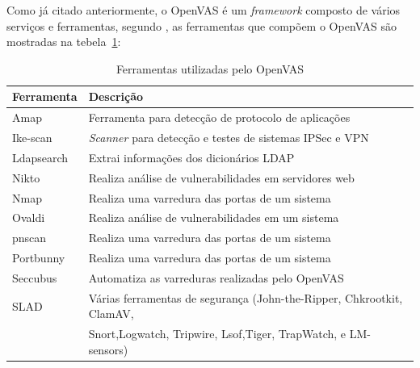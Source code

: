 Como já citado anteriormente, o \gls{OpenVAS} é um \textit{framework} composto de vários serviços e ferramentas, segundo , as ferramentas que compõem o \gls{OpenVAS} são mostradas na tebela~\ref{openvas-table}:
\begin{table}[H]
\centering
\caption{Ferramentas utilizadas pelo \gls{OpenVAS}}
\label{openvas-table}
\begin{tabular}{|l|l|}
\hline
\multicolumn{1}{|l|}{Ferramenta} & \multicolumn{1}{|l|}{Descrição}                                                                                                          \\ \hline
Amap                             & Ferramenta para detecção de protocolo de aplicações                                                                                     \\\hline
Ike-scan                         & \textit{Scanner} para detecção e testes de sistemas IPSec e VPN                                                                          \\\hline
Ldapsearch                       & Extrai informações dos dicionários LDAP                                                                                                 \\\hline
Nikto                            & Realiza análise de vulnerabilidades em servidores web                                                                                   \\\hline
Nmap                             & Realiza uma varredura das portas de um sistema                                                                                          \\\hline
Ovaldi                           & Realiza análise de vulnerabilidades em um sistema                                                                                       \\\hline
pnscan                           & Realiza uma varredura das portas de um sistema                                                                                          \\\hline
Portbunny                        & Realiza uma varredura das portas de um sistema                                                                                          \\\hline
Seccubus                         & Automatiza as varreduras realizadas pelo \gls{OpenVAS}                                                                                \\\hline
SLAD                             & Várias ferramentas de segurança (John-the-Ripper, Chkrootkit, ClamAV,  
\\&Snort,Logwatch, Tripwire, Lsof,Tiger, TrapWatch, e LM-sensors) \\\hline
                          

\end{tabular}
\end{table}
